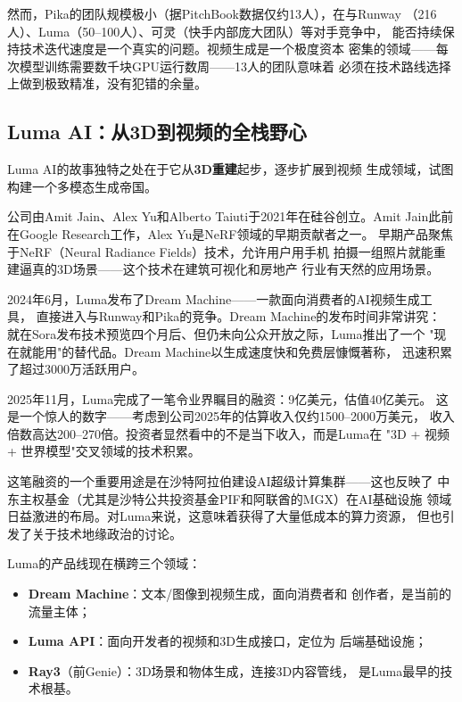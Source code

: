 然而，Pika的团队规模极小（据PitchBook数据仅约13人），在与Runway
（216人）、Luma（50--100人）、可灵（快手内部庞大团队）等对手竞争中，
能否持续保持技术迭代速度是一个真实的问题。视频生成是一个极度资本
密集的领域——每次模型训练需要数千块GPU运行数周——13人的团队意味着
必须在技术路线选择上做到极致精准，没有犯错的余量。

\subsection{Luma AI：从3D到视频的全栈野心}
\label{subsec:luma}

Luma AI的故事独特之处在于它从\textbf{3D重建}起步，逐步扩展到视频
生成领域，试图构建一个多模态生成帝国。

公司由Amit Jain、Alex Yu和Alberto Taiuti于2021年在硅谷创立。Amit
Jain此前在Google Research工作，Alex Yu是NeRF领域的早期贡献者之一。
早期产品聚焦于NeRF（Neural Radiance Fields）技术，允许用户用手机
拍摄一组照片就能重建逼真的3D场景——这个技术在建筑可视化和房地产
行业有天然的应用场景。

2024年6月，Luma发布了Dream Machine——一款面向消费者的AI视频生成工具，
直接进入与Runway和Pika的竞争。Dream Machine的发布时间非常讲究：
就在Sora发布技术预览四个月后、但仍未向公众开放之际，Luma推出了一个
"现在就能用"的替代品。Dream Machine以生成速度快和免费层慷慨著称，
迅速积累了超过3000万活跃用户。

2025年11月，Luma完成了一笔令业界瞩目的融资：9亿美元，估值40亿美元。
这是一个惊人的数字——考虑到公司2025年的估算收入仅约1500--2000万美元，
收入倍数高达200--270倍。投资者显然看中的不是当下收入，而是Luma在
"3D + 视频 + 世界模型"交叉领域的技术积累。

这笔融资的一个重要用途是在沙特阿拉伯建设AI超级计算集群——这也反映了
中东主权基金（尤其是沙特公共投资基金PIF和阿联酋的MGX）在AI基础设施
领域日益激进的布局。对Luma来说，这意味着获得了大量低成本的算力资源，
但也引发了关于技术地缘政治的讨论。

Luma的产品线现在横跨三个领域：
\begin{itemize}
  \item \textbf{Dream Machine}：文本/图像到视频生成，面向消费者和
    创作者，是当前的流量主体；
  \item \textbf{Luma API}：面向开发者的视频和3D生成接口，定位为
    后端基础设施；
  \item \textbf{Ray3}（前Genie）：3D场景和物体生成，连接3D内容管线，
    是Luma最早的技术根基。
\end{itemize}

